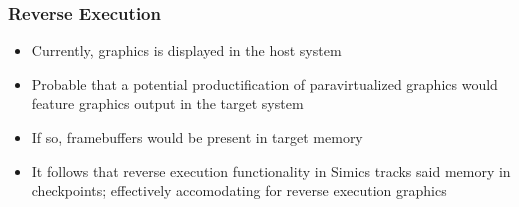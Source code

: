 
\begin{frame}

\frametitle{Reverse Execution}

\begin{itemize}
	\item Currently, graphics is displayed in the host system
	\item Probable that a potential productification of paravirtualized graphics would feature graphics output in the target system
	\item If so, framebuffers would be present in target memory
	\item It follows that reverse execution functionality in Simics tracks said memory in checkpoints; effectively accomodating for reverse execution graphics
\end{itemize}

\end{frame}

